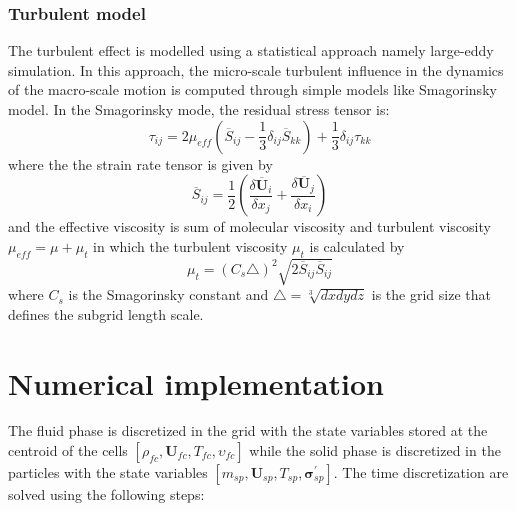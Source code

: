 \documentclass[preprint,12pt]{elsarticle}
\begin{document}
\subsubsection{Turbulent model}
The turbulent effect is modelled using a statistical approach namely large-eddy simulation. In this approach, the micro-scale turbulent influence in the dynamics of the macro-scale motion is computed through simple models like Smagorinsky model. In the Smagorinsky mode, the residual stress tensor is:
%
\begin{equation}
     \tau_{ij} = 2 \mu_{eff} (\overline{S}_{ij} - \frac{1}{3} \delta_{ij} \overline{S}_{kk}) + \frac{1}{3} \delta_{ij} \tau_{kk}
\end{equation}
%
%
where the the strain rate tensor is given by
%
\begin{equation}
     \overline{S}_{ij} = \frac{1}{2} (\frac{\delta \overline{\pmb{U}}_i}{\delta x_j} + \frac{\delta \overline{\pmb{U}}_j}{\delta x_i})
\end{equation}
%
%
and the effective viscosity is sum of molecular viscosity and turbulent viscosity $\mu_{eff} = \mu + \mu_t$ in which the turbulent viscosity $\mu_t$ is calculated by
%
\begin{equation}
    \mu_t = (C_s \triangle)^2 \sqrt{2 \overline{S}_{ij} \overline{S}_{ij}}
\end{equation}
%
%
where $C_s$ is the Smagorinsky constant and $\triangle = \sqrt[3]{dx dy dz}$ is the grid size that defines the subgrid length scale. 
%
\section{\textsf{Numerical implementation}}
\label{Discretization}
The fluid phase is discretized in the grid with the state variables stored at the centroid of the cells $[\rho_{fc},\pmb{U}_{fc},T_{fc},\upsilon_{fc}]$ while the solid phase is discretized in the particles with the state variables $[m_{sp},\pmb{U}_{sp},T_{sp},\pmb{\sigma}^\prime_{sp}]$. The time discretization are solved using the following steps:\\
%
%
\end{document}
